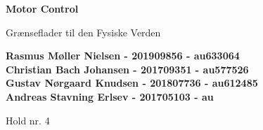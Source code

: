 \documentclass{article}
\begin{document}
\begin{titlepage}
    
    \begin{center}
        \vspace*{1cm}
 
        \Huge
        \textbf{Motor Control}
 
        \vspace{0.5cm}
        \LARGE
        Grænseflader til den Fysiske Verden \\
        \date\today
 
        \vspace{1.5cm}
 
        \textbf{
        Rasmus Møller Nielsen - 201909856 - au633064 \\
	   Christian Bach Johansen - 201709351 - au577526\\
	   Gustav Nørgaard Knudsen - 201807736 - au612485\\
	   Andreas Stavning Erlsev - 201705103 - au}
        
        \vfill
        \vspace{2cm}
 
        Hold nr. 4
 
    \end{center}
\end{titlepage}

\newpage
\newpage

\setcounter{page}{1}

\end{document}
